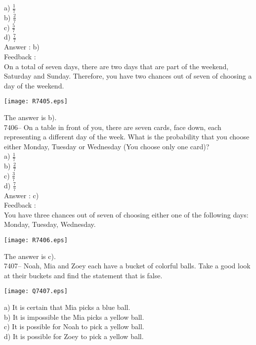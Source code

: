 \documentclass[letterpaper, 12pt]{article}
\begin{document}
a) $\frac{1}{7}$\\

b) $\frac{2}{7}$\\

c) $\frac{5}{7}$\\

d) $\frac{7}{7}$\\

Answer : b)\\

Feedback :\\
On a total of seven days, there are two days that are part of the weekend, Saturday and Sunday. Therefore, you have two chances out of seven of choosing a day of the weekend. \\
\begin{center}
\texttt{[image: R7405.eps]}
\end{center}

The answer is b).\\

7406-- On a table in front of you, there are seven cards, face down, each representing a different day of the week. What is the probability that you choose either Monday, Tuesday or Wednesday (You choose only one card)?\\

a) $\frac{1}{7}$\\

b) $\frac{2}{7}$\\

c) $\frac{3}{7}$\\

d) $\frac{7}{7}$\\

Answer : c)\\

Feedback :\\
You have three chances out of seven of choosing either one of the following days: Monday, Tuesday, Wednesday.  \\
\begin{center}
\texttt{[image: R7406.eps]}
\end{center}

The answer is c).\\

7407-- Noah, Mia and Zoey each have a bucket of colorful balls. Take a good look at their buckets and find the statement that is false.\\
\begin{center}
\texttt{[image: Q7407.eps]}
\end{center}
a) It is certain that Mia picks a blue ball.\\
b) It is impossible the Mia picks a yellow ball.\\
c) It is possible for Noah to pick a yellow ball.\\
d) It is possible for Zoey to pick a yellow ball.\\
\end{document}
